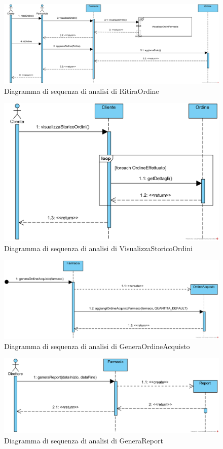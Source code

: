 \begin{figure}[!hbp]
	\centering
	\includegraphics[width=0.8\linewidth]{assets/sequence_analisi/SequenceAnalisiRitiraOrdine.png}
	\caption{Diagramma di sequenza di analisi di RitiraOrdine}
\end{figure}

\begin{figure}[!hbp]
	\centering
	\includegraphics[width=0.8\linewidth]{assets/sequence_analisi/SequenceAnalisiVisualizzaStoricoOrdini.png}
	\caption{Diagramma di sequenza di analisi di VisualizzaStoricoOrdini}
\end{figure}

\begin{figure}[!hbp]
	\centering
	\includegraphics[width=0.8\linewidth]{assets/sequence_analisi/SequenceAnalisiGeneraOrdineAcquisto.png}
	\caption{Diagramma di sequenza di analisi di GeneraOrdineAcquisto}
\end{figure}

\begin{figure}[!hbp]
	\centering
	\includegraphics[width=0.8\linewidth]{assets/sequence_analisi/SequenceAnalisiGeneraReport.png}
	\caption{Diagramma di sequenza di analisi di GeneraReport}
\end{figure}

